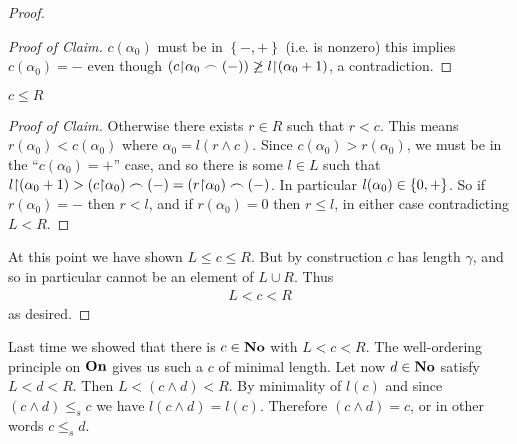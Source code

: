 \begin{proof}
\begin{proof}[Proof of Claim]
		$c(\alpha_0)$ must be in $\left\{ -, + \right\}$ (i.e. 
		is nonzero) this implies $c(\alpha_0) = -$ even though 
		$(c \mathord{\upharpoonright} \alpha_0 \frown (-)) \not \geq 
		l \mathord{\upharpoonright} (\alpha_0 + 1)$, a contradiction. 
	\end{proof}
	\begin{claim}
		$c \leq R$	
	\end{claim}
	\begin{proof}[Proof of Claim]
		Otherwise there exists $r \in R$ such that 
		$r < c$. This means $r(\alpha_0) < c(\alpha_0)$ 
		where $\alpha_0 = l(r \land c)$. 
		Since $c(\alpha_0) > r(\alpha_0)$, 
		we must be in the ``$c(\alpha_0) = +$'' case, and so 
		there is some $l \in L$ such that 
		$l \mathord{\upharpoonright} (\alpha_0 + 1) > (c \mathord{\upharpoonright} \alpha_0) 
		\frown (-) = (r \mathord{\upharpoonright} \alpha_0) \frown (-)$. 
		In particular $l(\alpha_0) \in \left\{ 0, + \right\}$. 
		So if $r(\alpha_0) = -$ then $r < l$, and if 
		$r(\alpha_0) = 0$ then $r \leq l$, in either 
		case contradicting $L < R$. 
	\end{proof}
	At this point we have shown $L \leq c \leq R$. 
	But by construction $c$ has length $\gamma$, and so 
	in particular cannot be an element of $L \cup R$. 
	Thus 
	\begin{align*}
		L < c < R
	\end{align*}
	as desired. 
\end{proof}

Last time we showed that there is $c \in \mathbf{No}$ with $L < c < R$. 
The well-ordering principle on $\mathbf{On}$ gives us such a $c$ of minimal 
length. Let now $d \in \mathbf{No}$ satisfy $L < d < R$. Then 
$L < (c \wedge d) < R$. By minimality of $l(c)$ and since 
$(c \wedge d) \leq_s c$ we have $l(c \wedge d) = l(c)$. 
Therefore $(c \wedge d) = c$, or in other words $c \leq_s d$. 

